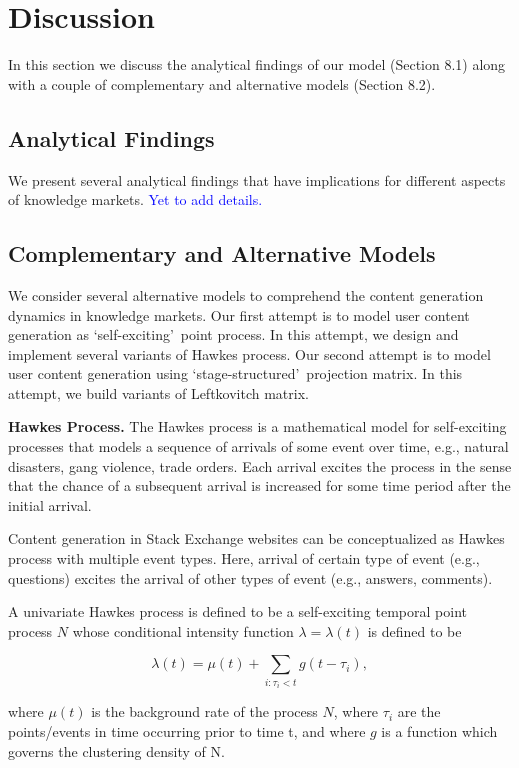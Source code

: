 \section{Discussion}
In this section we discuss the analytical findings of our model (Section 8.1) along with a couple of complementary and alternative models (Section 8.2).

\subsection{Analytical Findings}
We present several analytical findings that have implications for different aspects of knowledge markets. \textcolor{blue}{Yet to add details.}

\subsection{Complementary and Alternative Models}
We consider several alternative models to comprehend the content generation dynamics in knowledge markets. Our first attempt is to model user content generation as \lq self-exciting\rq\ point process. In this attempt, we design and implement several variants of Hawkes process. Our second attempt is to model user content generation using \lq stage-structured\rq\ projection matrix. In this attempt, we build variants of Leftkovitch matrix. 

\textbf{Hawkes Process.} The Hawkes process is a mathematical model for self-exciting processes that models a sequence of arrivals of some event over time, e.g., natural disasters, gang violence, trade orders.  Each arrival excites the process in the sense that the chance of a subsequent arrival is increased for some time period after the initial arrival. 

Content generation in Stack Exchange websites can be conceptualized as Hawkes process with multiple event types. Here, arrival of certain type of event (e.g., questions) excites the arrival of other types of event (e.g., answers, comments). 

A univariate Hawkes process is defined to be a self-exciting temporal point process $N$ whose conditional intensity function $\lambda = \lambda(t)$ is defined to be

 $$\lambda(t) = \mu(t)+\sum_{i:\tau_i<t}g(t-\tau_i),$$
 
where $\mu(t)$ is the background rate of the process  $N$, where $\tau_i$ are the points/events in time occurring prior to time t, and where $g$ is a function which governs the clustering density of N. 


